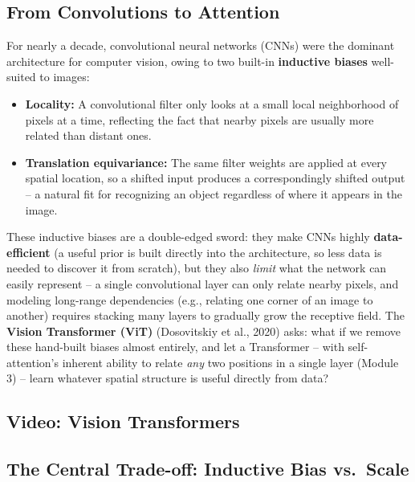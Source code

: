 \documentclass[12pt,a4paper]{article}
\begin{document}
\subsection{From Convolutions to Attention}

For nearly a decade, convolutional neural networks (CNNs) were the dominant architecture for computer vision, owing to two built-in \textbf{inductive biases} well-suited to images:

\begin{itemize}[leftmargin=1.5em]
    \item \textbf{Locality:} A convolutional filter only looks at a small local neighborhood of pixels at a time, reflecting the fact that nearby pixels are usually more related than distant ones.
    \item \textbf{Translation equivariance:} The same filter weights are applied at every spatial location, so a shifted input produces a correspondingly shifted output -- a natural fit for recognizing an object regardless of where it appears in the image.
\end{itemize}

\begin{keyidea}
These inductive biases are a double-edged sword: they make CNNs highly \textbf{data-efficient} (a useful prior is built directly into the architecture, so less data is needed to discover it from scratch), but they also \emph{limit} what the network can easily represent -- a single convolutional layer can only relate nearby pixels, and modeling long-range dependencies (e.g., relating one corner of an image to another) requires stacking many layers to gradually grow the receptive field. The \textbf{Vision Transformer (ViT)} (Dosovitskiy et al., 2020) asks: what if we remove these hand-built biases almost entirely, and let a Transformer -- with self-attention's inherent ability to relate \emph{any} two positions in a single layer (Module 3) -- learn whatever spatial structure is useful directly from data?
\end{keyidea}

\subsection{Video: Vision Transformers}

\subsection{The Central Trade-off: Inductive Bias vs.\ Scale}
\end{document}
